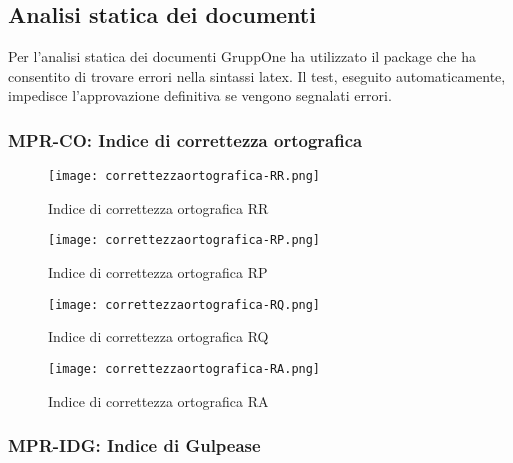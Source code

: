 \documentclass[../piano-di-qualifica.tex]{subfiles}
\begin{document}
\subsection{Analisi statica dei documenti}%
\label{sub:analisi_statica_doc}
Per l'analisi statica dei documenti GruppOne ha utilizzato il package  che ha consentito di trovare errori nella sintassi latex.
Il test, eseguito automaticamente, impedisce l'approvazione definitiva se vengono segnalati errori.

\subsubsection{MPR-CO\@: Indice di correttezza ortografica}%
\label{subs:indice_corr_ortografica}

\begin{figure}[H]
  \centering
  \texttt{[image: correttezzaortografica-RR.png]}%
  \caption{Indice di correttezza ortografica \- RR}%
  \label{fig:indice_correttezza_ortografica_RR}%
\end{figure}


\begin{figure}[H]
  \centering
  \texttt{[image: correttezzaortografica-RP.png]}%
  \caption{Indice di correttezza ortografica \- RP}%
  \label{fig:indice_correttezza_ortografica_RP}%
\end{figure}

\begin{figure}[H]
  \centering
  \texttt{[image: correttezzaortografica-RQ.png]}%
  \caption{Indice di correttezza ortografica \- RQ}%
  \label{fig:indice_correttezza_ortografica_RQ}%
\end{figure}

\begin{figure}[H]
  \centering
  \texttt{[image: correttezzaortografica-RA.png]}%
  \caption{Indice di correttezza ortografica \- RA}%
  \label{fig:indice_correttezza_ortografica_RA}%
\end{figure}


\subsubsection{MPR-IDG\@: Indice di Gulpease}%
\label{subs:indice_gulpease}
\end{document}
